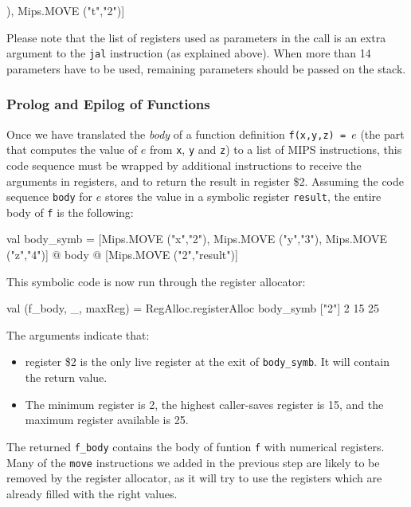 \documentclass[11pt,a4paper]{article}
\newcommand{\codesize}{\scriptsize}
\newcommand{\cd}[1]{{{\codesize\tt #1}}}
\begin{document}
\begin{code}
[Mips.MOVE ("2","x"),
 Mips.MOVE ("3","y"),
 Mips.MOVE ("4","z"),
 Mips.JAL ("f",["2","3","4"]),
 Mips.MOVE ("t","2")]
\end{code}

Please note that the list of registers used as parameters in the call is
an extra argument to the \cd{jal} instruction (as explained above).
When more than 14 parameters have to be used, remaining parameters should 
be passed on the stack.

\subsubsection{Prolog and Epilog of Functions}

Once we have translated the \emph{body} of a function definition 
\cd{f(x,y,z) = $e$} (the part that computes the value of $e$ from 
\cd{x}, \cd{y} and \cd{z}) to a list of MIPS instructions, this code
sequence must be wrapped by additional instructions to receive the
arguments in registers, and to return the result in register \$2.
Assuming the code sequence \cd{body} for $e$ stores the value in 
a symbolic register \cd{result}, the
entire body of \cd{f} is the following:

\begin{code}
val body_symb = [Mips.MOVE ("x","2"),
                 Mips.MOVE ("y","3"),
                 Mips.MOVE ("z","4")]
                @ body @
                [Mips.MOVE ("2","result")]
\end{code}

This symbolic code is now run through the register allocator:

\begin{code}
val (f_body, _, maxReg) =
        RegAlloc.registerAlloc body_symb ["2"] 2 15 25
\end{code}
The arguments indicate that:
\begin{itemize}
\item register \$2 is the only live register at the exit of \cd{body\_symb}.
	It will contain the return value.
\item The minimum register is 2, the highest caller-saves register is 15,
	 and the maximum register available is 25.
\end{itemize}

The returned \cd{f\_body} contains the body of funtion \cd{f} with numerical
registers. Many of the \cd{move} instructions we added in the previous step
are likely to be removed by the register allocator, as it will try to use 
the registers which are already filled with the right values.
\end{document}
